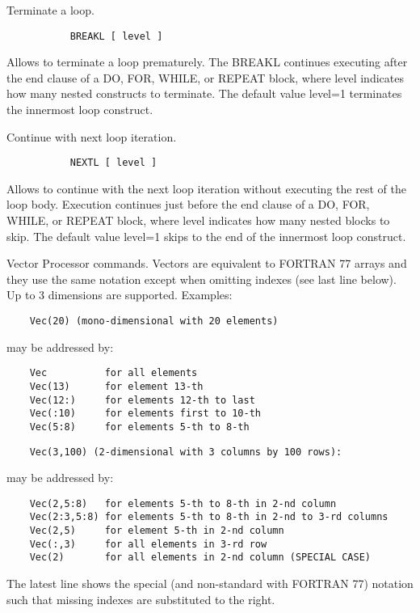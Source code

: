 \ENDCMD


   \par
Terminate a loop.  

\begin{verbatim}
           BREAKL [ level ]
\end{verbatim}
\ENDVERB
   \par
Allows to terminate a loop prematurely. The BREAKL continues executing 
   after the end clause of a DO, FOR, WHILE, or REPEAT block, where 
   \DQUOTE{}level\DQUOTE{} indicates how many nested constructs to terminate.  
   The default value level=1 terminates the innermost loop construct.  

\ENDCMD


   \par
Continue with next loop iteration.  

\begin{verbatim}
           NEXTL [ level ]
\end{verbatim}
\ENDVERB
   \par
Allows to continue with the next loop iteration without executing the rest 
   of the loop body.  Execution continues just before the end clause of a DO, 
   FOR, WHILE, or REPEAT block, where \DQUOTE{}level\DQUOTE{} indicates how 
   many nested blocks to skip.  The default value level=1 skips to the end of 
   the innermost loop construct.  

\ENDCMD
{}
\ifMENUtext
   \par
Vector Processor commands.  Vectors are equivalent to FORTRAN 77 arrays and 
   they use the same notation except when omitting indexes (see last line 
   below).  Up to 3 dimensions are supported. Examples:  
\begin{verbatim}
    Vec(20) (mono-dimensional with 20 elements)
\end{verbatim}
   \par
may be addressed by:  
\begin{verbatim}
    Vec          for all elements
    Vec(13)      for element 13-th
    Vec(12:)     for elements 12-th to last
    Vec(:10)     for elements first to 10-th
    Vec(5:8)     for elements 5-th to 8-th
\end{verbatim}
\begin{verbatim}
    Vec(3,100) (2-dimensional with 3 columns by 100 rows):
\end{verbatim}
   \par
may be addressed by:  
\begin{verbatim}
    Vec(2,5:8)   for elements 5-th to 8-th in 2-nd column
    Vec(2:3,5:8) for elements 5-th to 8-th in 2-nd to 3-rd columns
    Vec(2,5)     for element 5-th in 2-nd column
    Vec(:,3)     for all elements in 3-rd row
    Vec(2)       for all elements in 2-nd column (SPECIAL CASE)
\end{verbatim}
   \par
The latest line shows the special (and non-standard with FORTRAN 77) 
   notation such that missing indexes are substituted to the right.  

